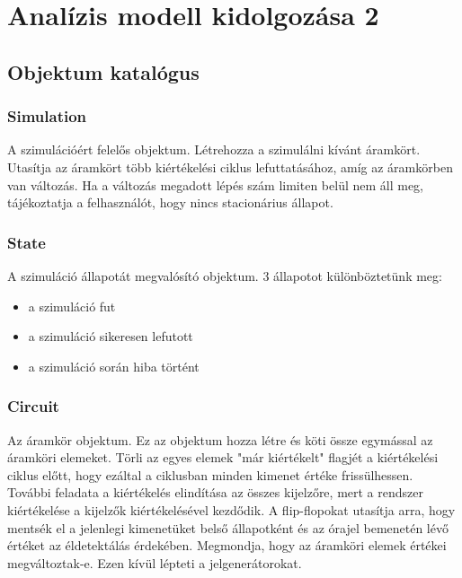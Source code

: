 %
\chapter{Analízis modell kidolgozása 2}

\thispagestyle{fancy}

\section{Objektum katalógus}

\subsection{\bf Simulation}
A szimulációért felelős objektum. Létrehozza a szimulálni kívánt áramkört. Utasítja az áramkört több kiértékelési ciklus lefuttatásához, amíg az áramkörben van változás. Ha a változás megadott lépés szám limiten belül nem áll meg, tájékoztatja a felhasználót, hogy nincs stacionárius állapot.

\subsection{\bf State}
A szimuláció állapotát megvalósító objektum. 3 állapotot különböztetünk meg:
\begin{itemize}
\item a szimuláció fut \item a szimuláció sikeresen lefutott \item a szimuláció során hiba történt
\end{itemize}

\subsection{\bf Circuit}
Az áramkör objektum. Ez az objektum hozza létre és köti össze egymással az áramköri elemeket. Törli az egyes elemek "már kiértékelt" flagjét a kiértékelési ciklus előtt, hogy ezáltal a ciklusban minden kimenet értéke frissülhessen. További feladata a kiértékelés elindítása az összes kijelzőre, mert a rendszer kiértékelése a kijelzők kiértékelésével kezdődik. A flip-flopokat utasítja arra, hogy mentsék el a jelenlegi kimenetüket belső állapotként és az órajel bemenetén lévő értéket az éldetektálás érdekében. Megmondja, hogy az áramköri elemek értékei megváltoztak-e. Ezen kívül lépteti a jelgenerátorokat.

